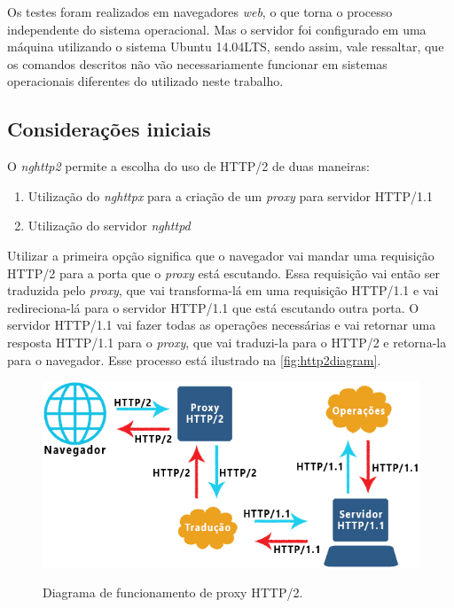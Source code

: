 Os testes foram realizados em navegadores \textit{web}, o que torna o processo independente do sistema operacional. Mas o servidor foi configurado em uma máquina utilizando o sistema Ubuntu 14.04LTS, sendo assim, vale ressaltar, que os comandos descritos não vão necessariamente funcionar em sistemas operacionais diferentes do utilizado neste trabalho.

\subsection{Considerações iniciais}
\label{consideracoesiniciais}

O \textit{nghttp2} permite a escolha do uso de HTTP/2 de duas maneiras:
\begin{enumerate}
	\item Utilização do \textit{nghttpx} para a criação de um \textit{proxy} para servidor HTTP/1.1
	\item Utilização do servidor \textit{nghttpd}
\end{enumerate}

Utilizar a primeira opção significa que o navegador vai mandar uma requisição HTTP/2 para a porta que o \textit{proxy} está escutando. Essa requisição vai então ser traduzida pelo \textit{proxy}, que vai transforma-lá em uma requisição HTTP/1.1 e vai redireciona-lá para o servidor HTTP/1.1 que está escutando outra porta. O servidor HTTP/1.1 vai fazer todas as operações necessárias e vai retornar uma resposta HTTP/1.1 para o \textit{proxy}, que vai traduzi-la para o HTTP/2 e retorna-la para o navegador. Esse processo está ilustrado na \autoref{fig:http2diagram}.

\begin{figure}[!htb]
    \centering
    \caption{Diagrama de funcionamento de proxy HTTP/2.}
    \includegraphics[width=1.0\textwidth]{./04-figuras/desenvolvimento/http2_proxy_diagram}
    \label{fig:http2diagram}
\end{figure}

